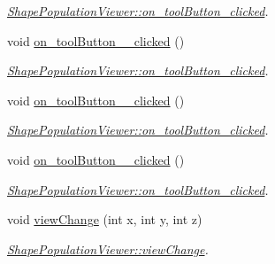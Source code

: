 \begin{DoxyCompactItemize}
\begin{DoxyCompactList}\small\item\em \hyperlink{class_shape_population_viewer_afe0890a97a545e451c4b9e745fd812f0}{Shape\-Population\-Viewer\-::on\-\_\-tool\-Button\-\_\-clicked}. \end{DoxyCompactList}\item 
void \hyperlink{class_shape_population_viewer_ae55f17f846f6e095898b7a78fcb8f39a}{on\-\_\-tool\-Button\-\_\-\_\-clicked} ()
\begin{DoxyCompactList}\small\item\em \hyperlink{class_shape_population_viewer_afe0890a97a545e451c4b9e745fd812f0}{Shape\-Population\-Viewer\-::on\-\_\-tool\-Button\-\_\-clicked}. \end{DoxyCompactList}\item 
void \hyperlink{class_shape_population_viewer_a0282bb576425b0c916c8a08d77f02d40}{on\-\_\-tool\-Button\-\_\-\_\-clicked} ()
\begin{DoxyCompactList}\small\item\em \hyperlink{class_shape_population_viewer_afe0890a97a545e451c4b9e745fd812f0}{Shape\-Population\-Viewer\-::on\-\_\-tool\-Button\-\_\-clicked}. \end{DoxyCompactList}\item 
void \hyperlink{class_shape_population_viewer_aaaef8b747a8f15bc59fb63c426111f88}{on\-\_\-tool\-Button\-\_\-\_\-clicked} ()
\begin{DoxyCompactList}\small\item\em \hyperlink{class_shape_population_viewer_afe0890a97a545e451c4b9e745fd812f0}{Shape\-Population\-Viewer\-::on\-\_\-tool\-Button\-\_\-clicked}. \end{DoxyCompactList}\item 
void \hyperlink{class_shape_population_viewer_a124d5f1057623616c3e33afb50d61eeb}{view\-Change} (int x, int y, int z)
\begin{DoxyCompactList}\small\item\em \hyperlink{class_shape_population_viewer_a124d5f1057623616c3e33afb50d61eeb}{Shape\-Population\-Viewer\-::view\-Change}. \end{DoxyCompactList}\end{DoxyCompactItemize}
